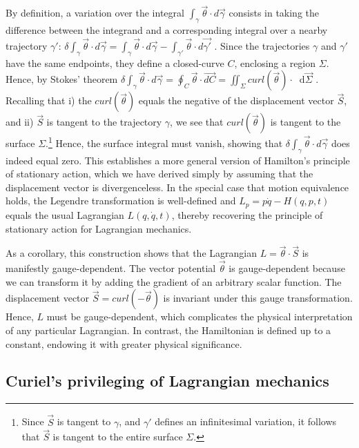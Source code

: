 \documentclass[12pt, twoside]{article}
\newcommand{\diff}{\mathop{}\!\mathrm{d}} %
\renewcommand{\vector}[1]{\ensuremath{\vec{#1}}} %
\newcommand{\integral}{\int}
\begin{document}
By definition, a variation over the integral $\integral_{\gamma} \vector{\theta} \cdot d\vector{\gamma}$ consists in taking the difference between the integrand and a corresponding integral over a nearby trajectory $\gamma'$: $\delta \integral_{\gamma} \vector{\theta} \cdot d\vector{\gamma} = \integral_{\gamma} \vector{\theta} \cdot d\vector{\gamma} - \integral_{\gamma'} \vector{\theta} \cdot d\vector{\gamma'}$ . Since the trajectories $\gamma$ and $\gamma'$ have the same endpoints, they define a closed-curve $C$, enclosing a region $\Sigma $. Hence, by Stokes' theorem $\delta \integral_{\gamma} \vector{\theta} \cdot d\vector{\gamma} = \oint_{C} \vector{\theta}  \cdot \vector{dC} = \iint_{\Sigma} curl(\vector{\theta}) \cdot \diff \vector{\Sigma}$ . Recalling that i) the $curl(\vector{\theta})$ equals the negative of the displacement vector $\vector{S}$, and ii)  $\vector{S}$ is tangent to the trajectory $\gamma $, we see that $curl(\vector{\theta})$ is tangent to the surface $\Sigma $.\footnote{Since $\vector{S}$ is tangent to $\gamma $, and $\gamma'$ defines an infinitesimal variation, it follows that $\vector{S}$ is tangent to the entire surface $\Sigma $.} Hence, the surface integral must vanish, showing that $\delta \integral_{\gamma} \vector{\theta} \cdot d\vector{\gamma}$ does indeed equal zero. This establishes a more general version of Hamilton's principle of stationary action, which we have derived simply by assuming that the displacement vector is divergenceless. In the special case that motion equivalence holds, the Legendre transformation is well-defined and $L_p = p \dot{q} - H(q, p, t)$ equals the usual Lagrangian $L(q, \dot{q}, t)$, thereby recovering the principle of stationary action for Lagrangian mechanics. 

As a corollary, this construction shows that the Lagrangian $L =\vector{\theta} \cdot \vector{S} $ is manifestly gauge-dependent. The vector potential $\vector{\theta}$ is gauge-dependent because we can transform it by adding the gradient of an arbitrary scalar function. The displacement vector $\vector{S} = curl(-\vector{\theta})$ is invariant under this gauge transformation. Hence, $L$ must be gauge-dependent, which complicates the physical interpretation of any particular Lagrangian. In contrast, the Hamiltonian is defined up to a constant, endowing it with greater physical significance.


\subsection{Curiel's privileging of Lagrangian mechanics}
\label{Curiel}
\end{document}
